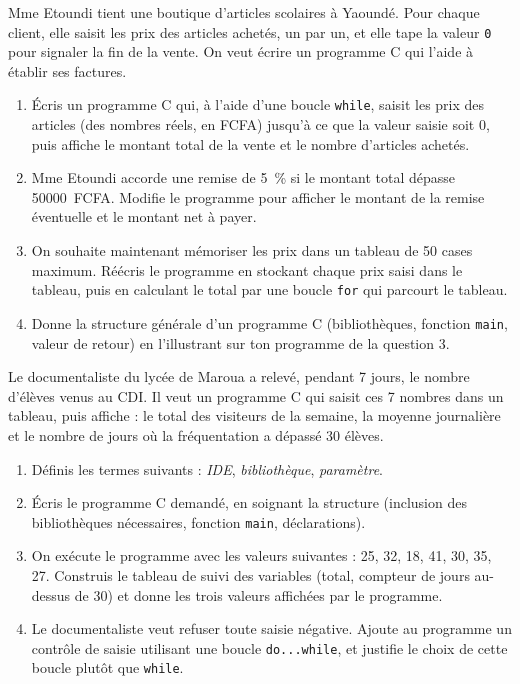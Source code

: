 \documentclass[11pt]{article}
\begin{document}
\begin{exercice}
Mme Etoundi tient une boutique d'articles scolaires à Yaoundé. Pour chaque client, elle saisit les prix des articles achetés, un par un, et elle tape la valeur \texttt{0} pour signaler la fin de la vente. On veut écrire un programme C qui l'aide à établir ses factures.
\begin{enumerate}
\item Écris un programme C qui, à l'aide d'une boucle \texttt{while}, saisit les prix des articles (des nombres réels, en FCFA) jusqu'à ce que la valeur saisie soit 0, puis affiche le montant total de la vente et le nombre d'articles achetés.
\item Mme Etoundi accorde une remise de 5~\% si le montant total dépasse \num{50000}~FCFA. Modifie le programme pour afficher le montant de la remise éventuelle et le montant net à payer.
\item On souhaite maintenant mémoriser les prix dans un tableau de 50 cases maximum. Réécris le programme en stockant chaque prix saisi dans le tableau, puis en calculant le total par une boucle \texttt{for} qui parcourt le tableau.
\item Donne la structure générale d'un programme C (bibliothèques, fonction \texttt{main}, valeur de retour) en l'illustrant sur ton programme de la question 3.
\end{enumerate}
\end{exercice}

\begin{exercice}
Le documentaliste du lycée de Maroua a relevé, pendant 7 jours, le nombre d'élèves venus au CDI. Il veut un programme C qui saisit ces 7 nombres dans un tableau, puis affiche : le total des visiteurs de la semaine, la moyenne journalière et le nombre de jours où la fréquentation a dépassé 30 élèves.
\begin{enumerate}
\item Définis les termes suivants : \emph{IDE}, \emph{bibliothèque}, \emph{paramètre}.
\item Écris le programme C demandé, en soignant la structure (inclusion des bibliothèques nécessaires, fonction \texttt{main}, déclarations).
\item On exécute le programme avec les valeurs suivantes : 25, 32, 18, 41, 30, 35, 27. Construis le tableau de suivi des variables (total, compteur de jours au-dessus de 30) et donne les trois valeurs affichées par le programme.
\item Le documentaliste veut refuser toute saisie négative. Ajoute au programme un contrôle de saisie utilisant une boucle \texttt{do...while}, et justifie le choix de cette boucle plutôt que \texttt{while}.
\end{enumerate}
\end{exercice}
\end{document}
